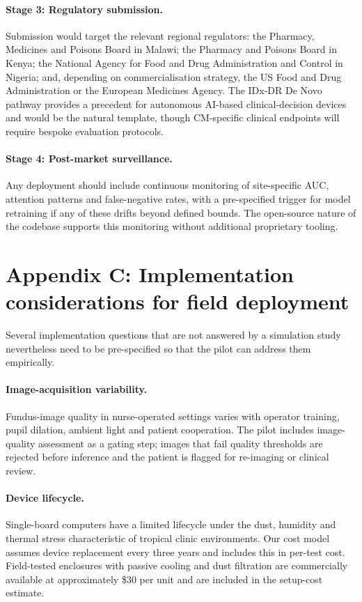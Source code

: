 \documentclass[twocolumn,10pt]{article}
\begin{document}
\paragraph{Stage 3: Regulatory submission.}
Submission would target the relevant regional regulators:
the Pharmacy, Medicines and Poisons Board in Malawi; the
Pharmacy and Poisons Board in Kenya; the National Agency for
Food and Drug Administration and Control in Nigeria; and,
depending on commercialisation strategy, the US Food and Drug
Administration or the European Medicines Agency. The IDx-DR De
Novo pathway \cite{Abramoff2018IDx} provides a precedent for
autonomous AI-based clinical-decision devices and would be the
natural template, though CM-specific clinical endpoints will
require bespoke evaluation protocols.

\paragraph{Stage 4: Post-market surveillance.}
Any deployment should include continuous monitoring of
site-specific AUC, attention patterns and false-negative rates,
with a pre-specified trigger for model retraining if any of
these drifts beyond defined bounds. The open-source nature of
the codebase supports this monitoring without additional
proprietary tooling.

\section*{Appendix C: Implementation considerations for field
deployment}
\label{app:implementation}
Several implementation questions that are not answered by a
simulation study nevertheless need to be pre-specified so that
the pilot can address them empirically.

\paragraph{Image-acquisition variability.}
Fundus-image quality in nurse-operated settings varies with
operator training, pupil dilation, ambient light and patient
cooperation. The pilot includes image-quality assessment as a
gating step; images that fail quality thresholds are rejected
before inference and the patient is flagged for re-imaging or
clinical review.

\paragraph{Device lifecycle.}
Single-board computers have a limited lifecycle under the dust,
humidity and thermal stress characteristic of tropical clinic
environments. Our cost model assumes device replacement every
three years and includes this in per-test cost. Field-tested
enclosures with passive cooling and dust filtration are
commercially available at approximately \$30 per unit and are
included in the setup-cost estimate.
\end{document}
